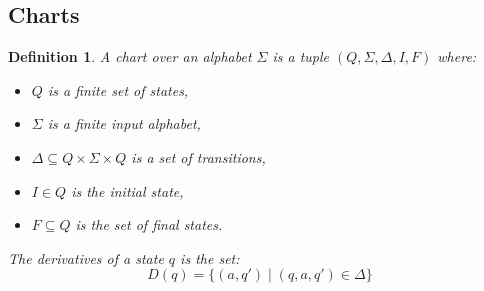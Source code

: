 \documentclass{article}
\newtheorem{definition}{Definition}[section]
\begin{document}
\subsection{Charts}
\begin{definition} 
A \emph{chart} over an alphabet $\Sigma$ is a tuple $(Q, \Sigma, \Delta, I, F)$ where:
\begin{itemize}
    \item $Q$ is a finite set of \emph{states},
    \item $\Sigma$ is a finite input alphabet,
    \item $\Delta \subseteq Q \times \Sigma \times Q$ is a set of \emph{transitions},
    \item $I \in Q$ is the \emph{initial} state,
    \item $F \subseteq Q$ is the set of \emph{final} states.
\end{itemize}
The derivatives of a state $q$ is the set:
$$ D(q) = \{ (a, q') \mid (q, a, q') \in \Delta \}$$
\end{definition}
\newcommand{\longxrightarrow}[2][]{\xrightarrow{\hspace{0.5em}#2\hspace{0.5em}}}

\end{document}
